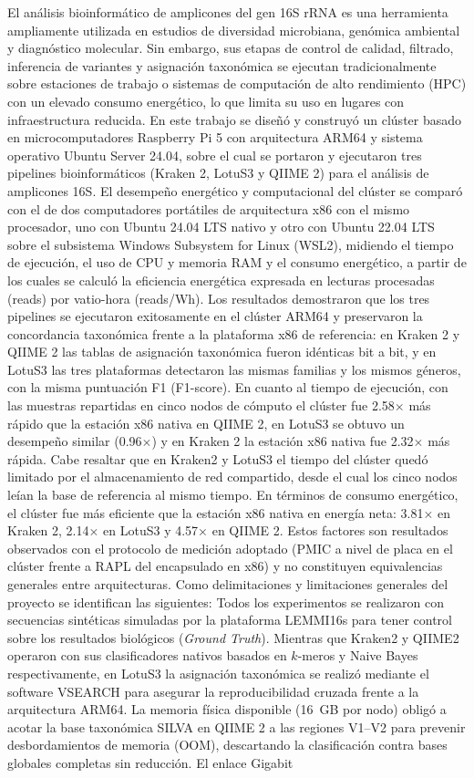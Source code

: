 \documentclass[12pt,oneside,spanish]{book}
\begin{document}
    El análisis bioinformático de amplicones del gen 16S rRNA es una herramienta ampliamente utilizada en estudios de diversidad microbiana, genómica ambiental y diagnóstico molecular. Sin embargo, sus etapas de control de calidad, filtrado, inferencia de variantes y asignación taxonómica se ejecutan tradicionalmente sobre estaciones de trabajo o sistemas de computación de alto rendimiento (HPC) con un elevado consumo energético, lo que limita su uso en lugares con infraestructura reducida. En este trabajo se diseñó y construyó un clúster basado en microcomputadores Raspberry Pi 5 con arquitectura ARM64 y sistema operativo Ubuntu Server 24.04, sobre el cual se portaron y ejecutaron tres pipelines bioinformáticos (Kraken 2, LotuS3 y QIIME 2) para el análisis de amplicones 16S. El desempeño energético y computacional del clúster se comparó con el de dos computadores portátiles de arquitectura x86 con el mismo procesador, uno con Ubuntu 24.04 LTS nativo y otro con Ubuntu 22.04 LTS sobre el subsistema Windows Subsystem for Linux (WSL2), midiendo el tiempo de ejecución, el uso de CPU y memoria RAM y el consumo energético, a partir de los cuales se calculó la eficiencia energética expresada en lecturas procesadas (reads)  por vatio-hora (reads/Wh). Los resultados demostraron que los tres pipelines se ejecutaron exitosamente en el clúster ARM64 y preservaron la concordancia taxonómica frente a la plataforma x86 de referencia: en Kraken 2 y QIIME 2 las tablas de asignación taxonómica fueron idénticas bit a bit, y en LotuS3 las tres plataformas detectaron las mismas familias y los mismos géneros, con la misma puntuación F1 (F1-score). En cuanto al tiempo de ejecución, con las muestras repartidas en cinco nodos de cómputo el clúster fue 2.58$\times$ más rápido que la estación x86 nativa en QIIME 2, en LotuS3 se obtuvo un desempeño similar (0.96$\times$) y en Kraken 2 la estación x86 nativa fue 2.32$\times$ más rápida. Cabe resaltar que en Kraken2 y LotuS3 el tiempo del clúster quedó limitado por el almacenamiento de red compartido, desde el cual los cinco nodos leían la base de referencia al mismo tiempo. En términos de consumo energético, el clúster fue más eficiente que la estación x86 nativa en energía neta: 3.81$\times$ en Kraken 2, 2.14$\times$ en LotuS3 y 4.57$\times$ en QIIME 2. Estos factores son resultados observados con el protocolo de medición adoptado (PMIC a nivel de placa en el clúster frente a RAPL del encapsulado en x86) y no constituyen equivalencias generales entre arquitecturas. Como delimitaciones y limitaciones generales del proyecto se identifican las siguientes: Todos los experimentos se realizaron con secuencias sintéticas simuladas por la plataforma LEMMI16s para tener control sobre los resultados biológicos (\textit{Ground Truth}). Mientras que Kraken2 y QIIME2 operaron con sus clasificadores nativos basados en $k$-meros y Naive Bayes respectivamente, en LotuS3 la asignación taxonómica se realizó mediante el software VSEARCH para asegurar la reproducibilidad cruzada frente a la arquitectura ARM64. La memoria física disponible (16~GB por nodo) obligó a acotar la base taxonómica SILVA en QIIME 2 a las regiones V1--V2 para prevenir desbordamientos de memoria (OOM), descartando la clasificación contra bases globales completas sin reducción. El enlace Gigabit 
\end{document}
